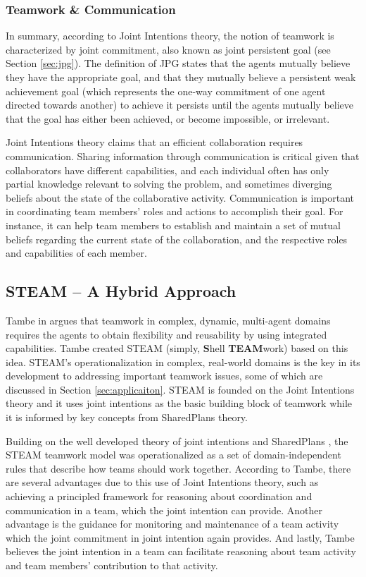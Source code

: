 \documentclass[12pt]{report}
\begin{document}
\subsubsection{Teamwork \& Communication}

In summary, according to Joint Intentions theory, the notion of teamwork is
characterized by joint commitment, also known as joint persistent goal (see
Section \ref{sec:jpg}). The definition of JPG states that the agents mutually
believe they have the appropriate goal, and that they mutually believe a
persistent weak achievement goal (which represents the one-way commitment of one
agent directed towards another) to achieve it persists until the agents mutually
believe that the goal has either been achieved, or become impossible, or
irrelevant.

Joint Intentions theory claims that an efficient collaboration requires
communication. Sharing information through communication is critical given that
collaborators have different capabilities, and each individual often has only
partial knowledge relevant to solving the problem, and sometimes diverging
beliefs about the state of the collaborative activity. Communication is
important in coordinating team members' roles and actions to accomplish their
goal. For instance, it can help team members to establish and maintain a set of
mutual beliefs regarding the current state of the collaboration, and the
respective roles and capabilities of each member.

\subsection{STEAM -- A Hybrid Approach}

Tambe in \cite{tambe:flexible-teamwork} argues that teamwork in complex,
dynamic, multi-agent domains requires the agents to obtain flexibility and
reusability by using integrated capabilities. Tambe created STEAM (simply,
\textbf{S}hell \textbf{TEAM}work) based on this idea. STEAM's operationalization
in complex, real-world domains is the key in its development to addressing
important teamwork issues, some of which are discussed in Section
\ref{sec:applicaiton}. STEAM is founded on the Joint Intentions theory and it
uses joint intentions as the basic building block of teamwork while it is
informed by key concepts from SharedPlans theory.

Building on the well developed theory of joint intentions \cite{cohen:teamwork}
and SharedPlans \cite{grosz:collaboration, grosz:plans-discourse}, the STEAM
teamwork model \cite{tambe:flexible-teamwork} was operationalized as a set of
domain-independent rules that describe how teams should work together. According
to Tambe, there are several advantages due to this use of Joint Intentions
theory, such as achieving a principled framework for reasoning about
coordination and communication in a team, which the joint intention can provide.
Another advantage is the guidance for monitoring and maintenance of a team
activity which the joint commitment in joint intention again provides. And
lastly, Tambe believes the joint intention in a team can facilitate reasoning
about team activity and team members' contribution to that activity.
\end{document}
